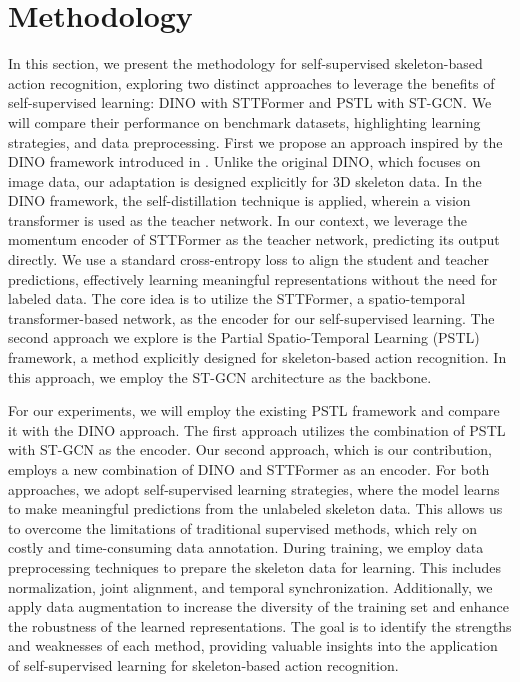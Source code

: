 \chapter{Methodology}
In this section, we present the methodology for self-supervised skeleton-based action recognition, exploring two distinct approaches to leverage the benefits of self-supervised learning: DINO with STTFormer and PSTL with ST-GCN. We will compare their performance on benchmark datasets, highlighting learning strategies, and data preprocessing. First we propose an approach inspired by the DINO framework introduced in \cite{caron2021emerging}. Unlike the original DINO, which focuses on image data, our adaptation is designed explicitly for 3D skeleton data. In the DINO framework, the self-distillation technique is applied, wherein a vision transformer is used as the teacher network. In our context, we leverage the momentum encoder of STTFormer as the teacher network, predicting its output directly. We use a standard cross-entropy loss to align the student and teacher predictions, effectively learning meaningful representations without the need for labeled data. The core idea is to utilize the STTFormer, a spatio-temporal transformer-based network, as the encoder for our self-supervised learning. The second approach we explore is the Partial Spatio-Temporal Learning (PSTL) framework, a method explicitly designed for skeleton-based action recognition. In this approach, we employ the ST-GCN architecture as the backbone.

For our experiments, we will employ the existing PSTL framework and compare it with the DINO approach. The first approach utilizes the combination of PSTL with ST-GCN as the encoder. Our second approach, which is our contribution, employs a new combination of DINO and STTFormer as an encoder. For both approaches, we adopt self-supervised learning strategies, where the model learns to make meaningful predictions from the unlabeled skeleton data. This allows us to overcome the limitations of traditional supervised methods, which rely on costly and time-consuming data annotation. During training, we employ data preprocessing techniques to prepare the skeleton data for learning. This includes normalization, joint alignment, and temporal synchronization. Additionally, we apply data augmentation to increase the diversity of the training set and enhance the robustness of the learned representations. The goal is to identify the strengths and weaknesses of each method, providing valuable insights into the application of self-supervised learning for skeleton-based action recognition.

